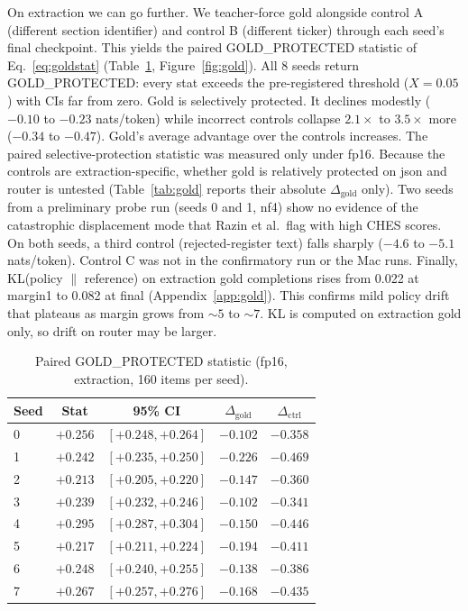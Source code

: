 \documentclass{article}
\begin{document}
On extraction we can go further. We teacher-force gold alongside control A (different section identifier) and control B (different ticker) through each seed's final checkpoint. This yields the paired GOLD\_PROTECTED statistic of Eq.~\eqref{eq:goldstat} (Table~\ref{tab:protected}, Figure~\ref{fig:gold}). All 8 seeds return GOLD\_PROTECTED: every stat exceeds the pre-registered threshold ($X = 0.05$) with CIs far from zero. Gold is selectively protected. It declines modestly ($-0.10$ to $-0.23$ nats/token) while incorrect controls collapse $2.1\times$ to $3.5\times$ more ($-0.34$ to $-0.47$). Gold's average advantage over the controls increases. The paired selective-protection statistic was measured only under fp16. Because the controls are extraction-specific, whether gold is relatively protected on json and router is untested (Table~\ref{tab:gold} reports their absolute $\Delta_{\text{gold}}$ only). Two seeds from a preliminary probe run (seeds 0 and 1, nf4) show no evidence of the catastrophic displacement mode that Razin et al.\ flag with high CHES scores. On both seeds, a third control (rejected-register text) falls sharply ($-4.6$ to $-5.1$ nats/token). Control C was not in the confirmatory run or the Mac runs. Finally, KL(policy $\|$ reference) on extraction gold completions rises from 0.022 at margin1 to 0.082 at final (Appendix~\ref{app:gold}). This confirms mild policy drift that plateaus as margin grows from ${\sim}5$ to ${\sim}7$. KL is computed on extraction gold only, so drift on router may be larger.

\begin{table}[H]
\centering
\caption{Paired GOLD\_PROTECTED statistic (fp16, extraction, 160 items per seed).}
\label{tab:protected}
\small
\begin{tabular}{@{}lcccc@{}}
\toprule
Seed & Stat & 95\% CI & $\Delta_{\text{gold}}$ & $\Delta_{\text{ctrl}}$\\
\midrule
0 & $+0.256$ & $[+0.248, +0.264]$ & $-0.102$ & $-0.358$\\
1 & $+0.242$ & $[+0.235, +0.250]$ & $-0.226$ & $-0.469$\\
2 & $+0.213$ & $[+0.205, +0.220]$ & $-0.147$ & $-0.360$\\
3 & $+0.239$ & $[+0.232, +0.246]$ & $-0.102$ & $-0.341$\\
4 & $+0.295$ & $[+0.287, +0.304]$ & $-0.150$ & $-0.446$\\
5 & $+0.217$ & $[+0.211, +0.224]$ & $-0.194$ & $-0.411$\\
6 & $+0.248$ & $[+0.240, +0.255]$ & $-0.138$ & $-0.386$\\
7 & $+0.267$ & $[+0.257, +0.276]$ & $-0.168$ & $-0.435$\\
\bottomrule
\end{tabular}
\end{table}
\end{document}
